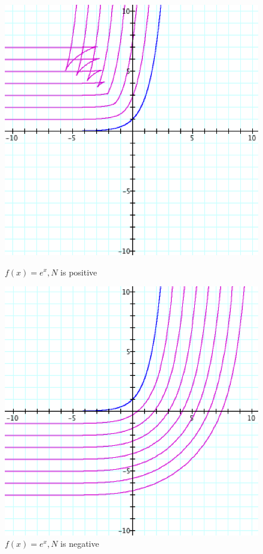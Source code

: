 \begin{figure}[h] 
  \label{example-3}
  \begin{minipage}[b]{0.5\linewidth}
    \centering
    \includegraphics[width=.9\linewidth]{some-examples-img/Fig 8.png}
    \caption{$f(x) = e^x, N$ is positive}
    \label{fig:fig8}
    \vspace{4ex}
  \end{minipage} %
  \begin{minipage}[b]{0.5\linewidth}
    \centering
    \includegraphics[width=.9\linewidth]{some-examples-img/Fig 9.png}
    \caption{$f(x) = e^x, N$ is negative}
    \label{fig:fig9}
    \vspace{4ex}
  \end{minipage} %
\end{figure}

